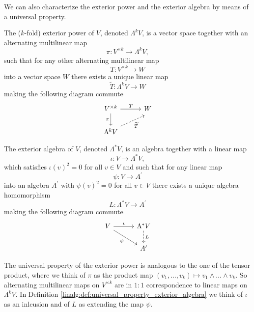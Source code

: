 We can also characterize the exterior power and the exterior algebra by means of a universal property. 

\begin{definition}
    \label{linalg:def:universal_property_exterior_power}
    The ($k$-fold) exterior power of $V$, denoted $\Lambda^k V$, is a vector space together with an alternating multilinear map 
    \[
    \pi \colon V^{\times k} \to \Lambda^k V,
    \]
    such that for any other alternating multilinear map 
    \[
    T \colon V^{\times k} \to W
    \]
    into a vector space $W$ there exists a unique linear map 
    \[
    \widetilde{T} \colon \Lambda^k V \to W
    \]
    making the following diagram commute 
    \[\begin{tikzcd}[column sep = 3em]
	{V^{\times k}} & W \\
	{\Lambda^k V}
	\arrow["T", from=1-1, to=1-2]
	\arrow["\pi"', from=1-1, to=2-1]
	\arrow["\widetilde{T}"', dashed, end anchor = {[xshift = 5, yshift = -3]}, from=2-1, to=1-2]
\end{tikzcd}\]
\end{definition}

\begin{definition}
    \label{linalg:def:universal_property_exterior_algebra}
    The exterior algebra of $V$, denoted $\Lambda^\ast V$, is an algebra together with a linear map 
    \[
    \iota \colon V \to \Lambda^\ast V,
    \]
    which satisfies $\iota(v)^2 = 0$ for all $v\in V$ and such that for any linear map 
    \[
    \psi \colon V \to A^\prime
    \]
    into an algebra $A^\prime$ with $\psi(v)^2 = 0$ for all $v\in V$ there exists a unique algebra homomorphism
    \[
    L \colon \Lambda^\ast V \to A^\prime
    \]
    making the following diagram commute 
    \[\begin{tikzcd}[column sep = 3em]
	{V} & \Lambda^\ast V\\
	& {A^\prime}
	\arrow["\iota", from=1-1, to=1-2]
	\arrow["\psi"', from=1-1, to=2-2]
	\arrow["L", dashed, from=1-2, to=2-2]
\end{tikzcd}\]
\end{definition}


\begin{remark}
    The universal property of the exterior power is analogous to the one of the tensor product, where we think of $\pi$ as the product map $(v_1, \ldots, v_k) \mapsto v_1 \wedge \ldots \wedge v_k$. So alternating multilinear maps on $V^{\times k}$ are in $1:1$ correspondence to linear maps on $\Lambda^k V$.
    In Definition \ref{linalg:def:universal_property_exterior_algebra} we think of $\iota$ as an inlcusion and of $L$ as extending the map $\psi$.
\end{remark}

